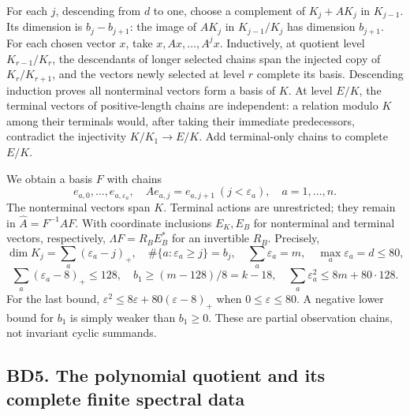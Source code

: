 \documentclass[11pt]{article}
\begin{document}
For each \(j\), descending from \(d\) to one, choose a complement of \(K_j+AK_j\) in \(K_{j-1}\). Its dimension is \(b_j-b_{j+1}\): the image of \(AK_j\) in \(K_{j-1}/K_j\) has dimension \(b_{j+1}\). For each chosen vector \(x\), take \(x,Ax,\ldots,A^jx\). Inductively, at quotient level \(K_{r-1}/K_r\), the descendants of longer selected chains span the injected copy of \(K_r/K_{r+1}\), and the vectors newly selected at level \(r\) complete its basis. Descending induction proves all nonterminal vectors form a basis of \(K\). At level \(E/K\), the terminal vectors of positive-length chains are independent: a relation modulo \(K\) among their terminals would, after taking their immediate predecessors, contradict the injectivity \(K/K_1\to E/K\). Add terminal-only chains to complete \(E/K\).

We obtain a basis \(F\) with chains \[
e_{a,0},\ldots,e_{a,\varepsilon_a},\quad
Ae_{a,j}=e_{a,j+1}\ (j<\varepsilon_a),\quad a=1,\ldots,n.
\] The nonterminal vectors span \(K\). Terminal actions are unrestricted; they remain in \(\widehat A=F^{-1}AF\). With coordinate inclusions \(E_K,E_B\) for nonterminal and terminal vectors, respectively, \(\Lambda F=R_B E_B^*\) for an invertible \(R_B\). Precisely, \[
\dim K_j=\sum_a(\varepsilon_a-j)_+,\quad
\#\{a:\varepsilon_a\ge j\}=b_j,\quad
\sum_a\varepsilon_a=m,\quad \max_a\varepsilon_a=d\le80,
\] \[
\sum_a(\varepsilon_a-8)_+\le128,\quad
b_1\ge(m-128)/8=k-18,\quad
\sum_a\varepsilon_a^2\le8m+80\cdot128. \tag{BD6}
\] For the last bound, \(\varepsilon^2\le8\varepsilon+80(\varepsilon-8)_+\) when \(0\le\varepsilon\le80\). A negative lower bound for \(b_1\) is simply weaker than \(b_1\ge0\). These are partial observation chains, not invariant cyclic summands.

\subsection{BD5. The polynomial quotient and its complete finite spectral data}\label{bd5.-the-polynomial-quotient-and-its-complete-finite-spectral-data}
\end{document}
